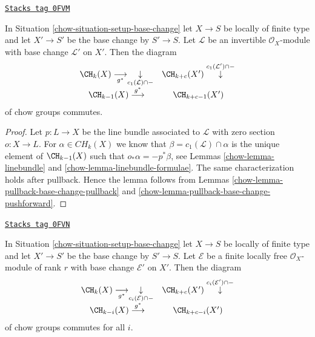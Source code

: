 \begin{lemma}
\label{chow-lemma-pullback-base-change-c1}
\href{https://stacks.math.columbia.edu/tag/0FVM}{\texttt{Stacks tag 0FVM}}

In Situation \ref{chow-situation-setup-base-change} let $X \to S$ be locally
of finite type and let $X' \to S'$ be the base change by $S' \to S$.
Let $\mathcal{L}$ be an invertible $\mathcal{O}_X$-module with
base change $\mathcal{L}'$ on $X'$. Then the
diagram
$$
\begin{array}{cc}\CH_k(X) \underset{g^*}{\longrightarrow}\underset{c_1(\mathcal{L}) \cap -}{\downarrow} & \CH_{k + c}(X') \overset{c_1(\mathcal{L}') \cap -}{\downarrow} \\ \CH_{k - 1}(X) \overset{g^*}{\longrightarrow} & \CH_{k + c - 1}(X')\end{array}
$$
of chow groups commutes.
\end{lemma}

\begin{proof}

Let $p : L \to X$ be the line bundle associated to $\mathcal{L}$
with zero section $o : X \to L$. For $\alpha \in CH_k(X)$ we
know that $\beta = c_1(\mathcal{L}) \cap \alpha$
is the unique element of $\CH_{k - 1}(X)$ such that
$o_*\alpha = - p^*\beta$, see Lemmas \ref{chow-lemma-linebundle} and
\ref{chow-lemma-linebundle-formulae}.
The same characterization holds after pullback. Hence the lemma follows from
Lemmas \ref{chow-lemma-pullback-base-change-pullback} and
\ref{chow-lemma-pullback-base-change-pushforward}.
\end{proof}

\begin{lemma}
\label{chow-lemma-pullback-base-change-chern-classes}
\href{https://stacks.math.columbia.edu/tag/0FVN}{\texttt{Stacks tag 0FVN}}

In Situation \ref{chow-situation-setup-base-change} let $X \to S$ be locally
of finite type and let $X' \to S'$ be the base change by $S' \to S$.
Let $\mathcal{E}$ be a finite locally free $\mathcal{O}_X$-module of
rank $r$ with base change $\mathcal{E}'$ on $X'$. Then the
diagram
$$
\begin{array}{cc}\CH_k(X) \underset{g^*}{\longrightarrow}\underset{c_i(\mathcal{E}) \cap -}{\downarrow} & \CH_{k + c}(X') \overset{c_i(\mathcal{E}') \cap -}{\downarrow} \\ \CH_{k - i}(X) \overset{g^*}{\longrightarrow} & \CH_{k + c - i}(X')\end{array}
$$
of chow groups commutes for all $i$.
\end{lemma}

